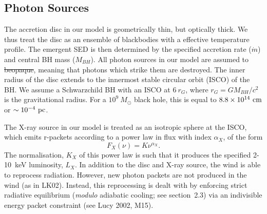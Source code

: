 \documentclass[preprint, a4paper, 11pt]{aastex}
\providecommand{\DIFadd}[1]{{\protect\color{blue}\uwave{#1}}} %
\providecommand{\DIFdel}[1]{{\protect\color{red}\sout{#1}}}                      %
\providecommand{\DIFaddbegin}{} %
\providecommand{\DIFaddend}{} %
\providecommand{\DIFdelbegin}{} %
\providecommand{\DIFdelend}{} %
\begin{document}
\DIFdelbegin %


\DIFdelend \subsection{Photon Sources}

\DIFdelbegin %

\DIFdelend The accretion disc in our model is geometrically thin, but optically thick.
We thus treat the disc as an ensemble of blackbodies with a 
\cite{shakurasunyaev1973} effective temperature profile. 
The emergent SED is then determined by the specified accretion rate ($\dot{m}$)
and central BH mass ($M_{BH}$).
All photon sources in our model are assumed to \DIFdelbegin \DIFdel{beopaque}\DIFdelend \DIFaddbegin \DIFadd{be opaque}\DIFaddend , meaning
that photons which strike them are destroyed.
The inner radius of the disc extends to the innermost 
stable circular orbit (ISCO) of the BH. 
We assume a Schwarzchild BH with an ISCO at $6~r_G$, where 
$r_G = GM_{BH}/c^2$ is the gravitational radius.
For a $10^9~M_\odot$ black hole, this is equal to $8.8\times10^{14}~{\rm cm}$ 
or $\sim10^{-4}~{\rm pc}$.  


The X-ray source in our model is treated as an isotropic sphere at the ISCO,
which emits r-packets according to a power law in flux with index $\alpha_X$, of the form
\begin{equation}
F_X (\nu) = K \nu^{\alpha_X}.
\end{equation}
The normalisation, $K_X$ of this power law is such that it 
produces the specified 2-10~keV luminosity, $L_X$.
In addition to the disc and X-ray source, 
the wind is able to reprocess radiation. However, new 
photon packets are not produced in the wind (as in LK02). 
Instead, this reprocessing is dealt with by enforcing strict
radiative equilibrium ({\em modulo} adiabatic cooling; see section~2.3)
via an indivisible energy packet
constraint (see Lucy 2002, M15).

\DIFdelbegin %
\end{document}
